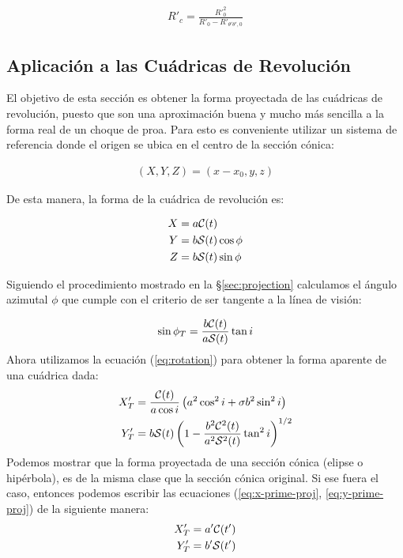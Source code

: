 \begin{align}
  R'_c = \frac{R'^2_0}{R'_0 - R'_{\theta'\theta', 0}} \label{eq:Rc-prime}
\end{align}

\subsection{Aplicación a las Cuádricas de Revolución}
\label{sec:pi-lambda-quadric}
El objetivo de esta sección es obtener la forma proyectada de las cuádricas de revolución, puesto que son una aproximación buena y mucho más sencilla a la forma real de un choque de proa. Para esto es conveniente utilizar un sistema de referencia donde el origen se ubica en el centro de la sección cónica:

\begin{align}
  (X, Y, Z) = (x-x_0, y, z)
\end{align}

De esta manera, la forma de la cuádrica de revolución es:

\begin{align}
  X &= a\mathcal{C}(t) \\
  Y &= b\mathcal{S}(t)\cos\phi \\
  Z &= b\mathcal{S}(t)\sin\phi
\end{align}

Siguiendo el procedimiento mostrado en la \S \ref{sec:projection} calculamos el ángulo azimutal $\phi$ que cumple con el criterio de ser tangente a la línea de visión: 

\begin{align}
  \sin\phi_T = \frac{b\mathcal{C}(t)}{a\mathcal{S}(t)}\tan i 
\end{align}
Ahora utilizamos la ecuación (\ref{eq:rotation}) para obtener la forma aparente de una cuádrica dada:
\begin{align}
  X'_T &= \frac{\mathcal{C}(t)}{a\cos i}\left(a^2\cos^2 i + \sigma b^2\sin^2 i\right)
  \label{eq:x-prime-proj}\\
  Y'_T &= b\mathcal{S}(t)\left(1 - \frac{b^2\mathcal{C}^2(t)}{a^2\mathcal{S}^2(t)}\tan^2 i\right)^{1/2}
  \label{eq:y-prime-proj}
\end{align}
Podemos mostrar que la forma proyectada de una sección cónica (elipse o hipérbola), es de la misma clase que la sección cónica original. Si ese fuera el caso, entonces podemos escribir las ecuaciones (\ref{eq:x-prime-proj}, \ref{eq:y-prime-proj}) de la siguiente manera:
\begin{align}
  X'_T &= a'\mathcal{C}(t') \label{eq:xtprime}\\
  Y'_T &= b'\mathcal{S}(t') \label{eq:ytprime}
\end{align}

